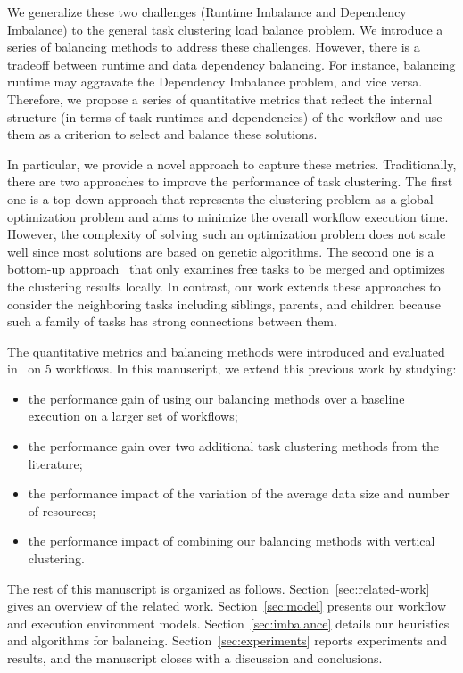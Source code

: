 \documentclass[final,5p,times,twocolumn]{elsarticle}
\begin{document}
We generalize these two challenges (Runtime Imbalance and Dependency Imbalance) to the general task clustering load balance problem. We introduce a series of balancing methods to address these challenges. However, there is a tradeoff between runtime and data dependency balancing. For instance, balancing runtime may aggravate the Dependency Imbalance problem, and vice versa. Therefore, we propose a series of quantitative metrics that reflect the internal structure (in terms of task runtimes and dependencies) of the workflow and use them as a criterion to select and balance these solutions.

In particular, we provide a novel approach to capture these metrics. Traditionally, there are two approaches to improve the performance of task clustering. The first one is a top-down approach \cite{6217508} that represents the clustering problem as a global optimization problem and aims to minimize the overall workflow execution time. However, the complexity of solving such an optimization problem does not scale well since most solutions are based on genetic algorithms. The second one is a bottom-up approach~\cite{Muthuvelu:2005:DJG:1082290.1082297,Liu2009} that only examines free tasks to be merged and optimizes the clustering results locally. In contrast, our work extends these approaches to consider the neighboring tasks including siblings, parents, and children because such a family of tasks has strong connections between them. 

The quantitative metrics and balancing methods were introduced and evaluated in~\cite{6683907} on 5 workflows. In this manuscript, we extend this previous work by studying:

\begin{itemize}[noitemsep,nolistsep]
	\item the performance gain of using our balancing methods over a baseline execution on a larger set of workflows;
	\item the performance gain over two additional task clustering methods from the literature;
	\item the performance impact of the variation of the average data size and number of resources;
	\item the performance impact of combining our balancing methods with vertical clustering.
\end{itemize}

The rest of this manuscript is organized as follows. Section~\ref{sec:related-work} gives an overview of the related work. Section~\ref{sec:model} presents our workflow and execution environment models. Section~\ref{sec:imbalance} details our heuristics and algorithms for balancing. Section~\ref{sec:experiments} reports experiments and results, and the manuscript closes with a discussion and conclusions.
\end{document}
